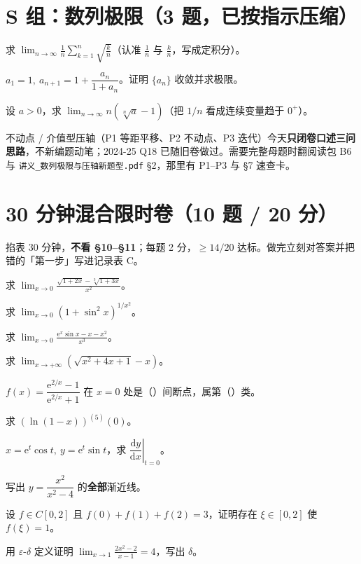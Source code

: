 \documentclass[11pt,a4paper]{ctexart}
\newcommand{\eps}{\varepsilon}
\newcommand{\ee}{\mathrm{e}}
\newcommand{\D}{\mathrm{d}}
\begin{document}
\section{S 组：数列极限（3 题，已按指示压缩）}

\begin{qlist}
\item 求 $\displaystyle\lim_{n\to\infty}\frac1n\sum_{k=1}^n\sqrt{\frac kn}$（认准 $\frac1n$ 与 $\frac kn$，写成定积分）。
\item $a_1=1,\ a_{n+1}=1+\dfrac{a_n}{1+a_n}$。证明 $\{a_n\}$ 收敛并求极限。
\item 设 $a>0$，求 $\displaystyle\lim_{n\to\infty}n\left(\sqrt[n]{a}-1\right)$（把 $1/n$ 看成连续变量趋于 $0^+$）。
\end{qlist}

\begin{keypoint}[压轴新题型只保温到这个程度]
不动点 / 介值型压轴（P1 等距平移、P2 不动点、P3 迭代）今天\textbf{只闭卷口述三问思路}，不新编题动笔；2024-25 Q18 已随旧卷做过。需要完整母题时翻阅读包 B6 与 \texttt{讲义\_数列极限与压轴新题型.pdf} \S 2，那里有 P1--P3 与 \S 7 速查卡。
\end{keypoint}

\section{30 分钟混合限时卷（10 题 / 20 分）}

\begin{center}
{\small 掐表 30 分钟，\textbf{不看 \S 10--\S 11}；每题 2 分，$\geq14/20$ 达标。做完立刻对答案并把错的「第一步」写进记录表 C。}
\end{center}

\begin{qlist}
\item 求 $\displaystyle\lim_{x\to0}\frac{\sqrt{1+2x}-\sqrt[3]{1+3x}}{x^2}$。
\item 求 $\displaystyle\lim_{x\to0}\left(1+\sin^2x\right)^{1/x^2}$。
\item 求 $\displaystyle\lim_{x\to0}\frac{\ee^x\sin x-x-x^2}{x^3}$。
\item 求 $\displaystyle\lim_{x\to+\infty}\left(\sqrt{x^2+4x+1}-x\right)$。
\item $f(x)=\dfrac{\ee^{2/x}-1}{\ee^{2/x}+1}$ 在 $x=0$ 处是（\quad）间断点，属第（\quad）类。
\item 求 $\left(\ln(1-x)\right)^{(5)}(0)$。
\item $x=\ee^t\cos t,\ y=\ee^t\sin t$，求 $\left.\dfrac{\D y}{\D x}\right|_{t=0}$。
\item 写出 $y=\dfrac{x^2}{x^2-4}$ 的\textbf{全部}渐近线。
\item 设 $f\in C[0,2]$ 且 $f(0)+f(1)+f(2)=3$，证明存在 $\xi\in[0,2]$ 使 $f(\xi)=1$。
\item 用 $\eps$-$\delta$ 定义证明 $\displaystyle\lim_{x\to1}\frac{2x^2-2}{x-1}=4$，写出 $\delta$。
\end{qlist}
\end{document}
